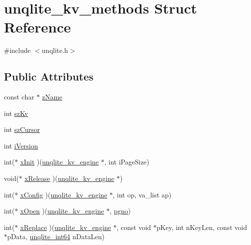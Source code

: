 \hypertarget{structunqlite__kv__methods}{\section{unqlite\-\_\-kv\-\_\-methods Struct Reference}
\label{d2/dfb/structunqlite__kv__methods}
}


{\ttfamily \#include $<$unqlite.\-h$>$}

\subsection*{Public Attributes}
\begin{DoxyCompactItemize}
\item 
const char $\ast$ \hyperlink{structunqlite__kv__methods_affaa0bf51b8acf365e78d0ca969f0462}{z\-Name}
\item 
int \hyperlink{structunqlite__kv__methods_a7ce3bc1bb75d2b89b33c6e2ba21e9b78}{sz\-Kv}
\item 
int \hyperlink{structunqlite__kv__methods_a1f661a27a021c83452bd5a5c7984f4a5}{sz\-Cursor}
\item 
int \hyperlink{structunqlite__kv__methods_ade29e7aa5bb2555ce02504e547a5c894}{i\-Version}
\item 
int($\ast$ \hyperlink{structunqlite__kv__methods_a0963f71dc84b26969847a47de6612d77}{x\-Init} )(\hyperlink{structunqlite__kv__engine}{unqlite\-\_\-kv\-\_\-engine} $\ast$, int i\-Page\-Size)
\item 
void($\ast$ \hyperlink{structunqlite__kv__methods_a4bd71b3cc5b47971a5d97bcb6a923e14}{x\-Release} )(\hyperlink{structunqlite__kv__engine}{unqlite\-\_\-kv\-\_\-engine} $\ast$)
\item 
int($\ast$ \hyperlink{structunqlite__kv__methods_aba801d097e9151daa9f83bd721b10856}{x\-Config} )(\hyperlink{structunqlite__kv__engine}{unqlite\-\_\-kv\-\_\-engine} $\ast$, int op, va\-\_\-list ap)
\item 
int($\ast$ \hyperlink{structunqlite__kv__methods_a9d9e77718c0a79e65394924b4d846581}{x\-Open} )(\hyperlink{structunqlite__kv__engine}{unqlite\-\_\-kv\-\_\-engine} $\ast$, \hyperlink{unqlite_8c_a90bf132c9229151f7c29e84e592907cd}{pgno})
\item 
int($\ast$ \hyperlink{structunqlite__kv__methods_aca537ffe7c05b16531bf17055d4505dd}{x\-Replace} )(\hyperlink{structunqlite__kv__engine}{unqlite\-\_\-kv\-\_\-engine} $\ast$, const void $\ast$p\-Key, int n\-Key\-Len, const void $\ast$p\-Data, \hyperlink{unqlite_8c_ae7dd2792142c2ec7874a56602b8f2bb8}{unqlite\-\_\-int64} n\-Data\-Len)

\end{DoxyCompactItemize}
